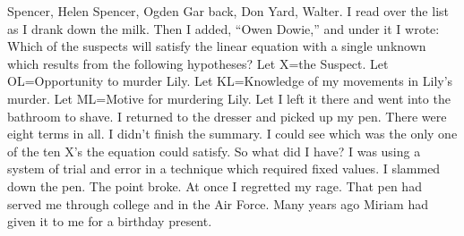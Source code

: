 \documentclass{novel}
\begin{document}
Spencer, Helen Spencer, Ogden Gar back, Don Yard, Walter. I read over the list as I drank down the milk. Then I added, “Owen Dowie,” and under it I wrote: Which of the suspects will satisfy the linear equation with a single unknown which results from the following hypotheses? Let X=the Suspect. Let OL=Opportunity to murder Lily. Let KL=Knowledge of my movements in Lily’s murder. Let ML=Motive for murdering Lily. Let I left it there and went into the bathroom to shave. I returned to the dresser and picked up my pen. There were eight terms in all. I didn’t finish the summary. I could see which was the only one of the ten X’s the equation could satisfy. So what did I have? I was using a system of trial and error in a technique which required fixed values. I slammed down the pen. The point broke. At once I regretted my rage. That pen had served me through college and in the Air Force. Many years ago Miriam had given it to me for a birthday present.


\begin{ChapterStart}

\vspace{3\nbs}
\end{ChapterStart}

\end{document}
